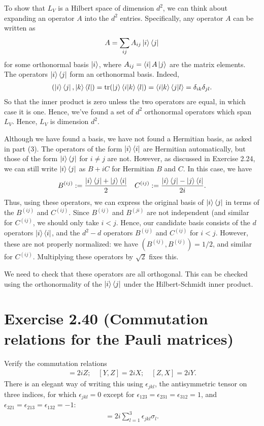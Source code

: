 \documentclass{book}
\begin{document}
    To show that $L_V$ is a Hilbert space of dimension $d^2$, we can think about expanding an operator $A$ into the $d^2$ entries. Specifically, any operator $A$ can be written as 
    \begin{align}
        A = \sum_{ij} A_{ij} \ket{i}\bra{j}
    \end{align}
    for some orthonormal basis $\ket{i}$, where $A_{ij} = \bra{i}A\ket{j}$ are the matrix elements. The operators $\ket{i}\bra{j}$ form an orthonormal basis. Indeed,
    \begin{align}
        (\ket{i}\bra{j}, \ket{k}\bra{l}) = \tr(\ket{j}\bra{i}\ket{k}\bra{l}) = \braket{i}{k} \braket{j}{l} = \delta_{ik}\delta_{jl}.
    \end{align}
    So that the inner product is zero unless the two operators are equal, in which case it is one. Hence, we've found a set of $d^2$ orthonormal operators which span $L_V$. Hence, $L_V$ is dimension $d^2$.
    
    Although we have found a basis, we have not found a Hermitian basis, as asked in part (3). The operators of the form $\ket{i}\bra{i}$ are Hermitian automatically, but those of the form $\ket{i}\bra{j}$ for $i\neq j$ are not. However, as discussed in Exercise 2.24, we can still write $\ket{i}\bra{j}$ as $B + iC$ for Hermitian $B$ and $C$. In this case, we have
    \begin{align} \label{eq:B_C_Hermitian}
        B^{(ij)} := \frac{\ket{i}\bra{j}+\ket{j}\bra{i}}{2} \quad  C^{(ij)} := \frac{\ket{i}\bra{j}-\ket{j}\bra{i}}{2i}.
    \end{align}
    Thus, using these operators, we can express the original basis of $\ket{i}\bra{j}$ in terms of the $B^{(ij)}$ and $C^{(ij)}$. Since $B^{(ij)}$ and $B^{(ji)}$ are not independent (and similar for $C^{(ij)}$, we should only take $i <j$. Hence, our candidate basis consists of the $d$ operators $\ket{i}\bra{i}$, and the $d^2 - d$ operators $B^{(ij)}$ and $C^{(ij)}$ for $i < j$. However, these are not properly normalized: we have $(B^{(ij)}, B^{(ij)}) = 1/2$, and similar for $C^{(ij)}$. Multiplying these operators by $\sqrt{2}$ fixes this.
    
    We need to check that these operators are all orthogonal. This can be checked using the orthonormality of the $\ket{i}\bra{j}$ under the Hilbert-Schmidt inner product. 
    
\section*{Exercise 2.40 (Commutation relations for the Pauli matrices)}
    Verify the commutation relations
    \begin{align}
        [X, Y] = 2iZ; \quad [Y, Z] = 2iX; \quad [Z, X] = 2iY.
    \end{align}
    There is an elegant way of writing this using $\epsilon_{jkl}$, the antisymmetric tensor on three indices, for which $\epsilon_{jkl} = 0$ except for $\epsilon_{123} = \epsilon_{231} = \epsilon_{312} = 1$, and $\epsilon_{321} = \epsilon_{213} = \epsilon_{132} = -1$:
    \begin{align}
        [\sigma_j, \sigma_k] = 2i \sum_{l=1}^3 \epsilon_{jkl} \sigma_l.
    \end{align}
    
\end{document}
